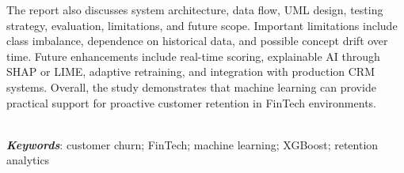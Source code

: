 The report also discusses system architecture, data flow, UML design, testing strategy, evaluation, limitations, and future scope. Important limitations include class imbalance, dependence on historical data, and possible concept drift over time. Future enhancements include real-time scoring, explainable AI through SHAP or LIME, adaptive retraining, and integration with production CRM systems. Overall, the study demonstrates that machine learning can provide practical support for proactive customer retention in FinTech environments.

\\
\textbf{\textit{Keywords}}: customer churn; FinTech; machine learning; XGBoost; retention analytics
\clearpage
